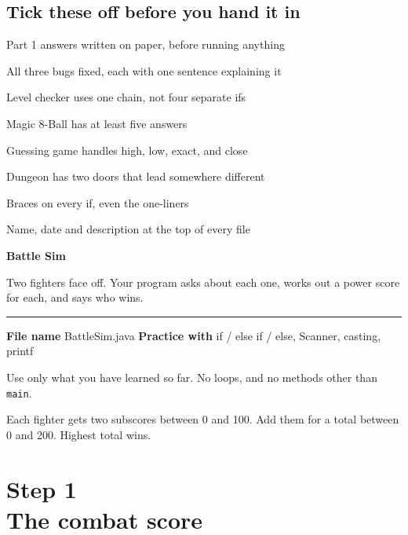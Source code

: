 \documentclass[11pt]{article}
\newcommand{\parttag}[1]{{\sffamily\footnotesize\color{arcane}#1}\\[1pt]}
\newcommand{\code}[1]{\texttt{#1}}
\begin{document}
\subsection*{Tick these off before you hand it in}

\begin{checks}
\item Part 1 answers written on paper, before running anything
\item All three bugs fixed, each with one sentence explaining it
\item Level checker uses one chain, not four separate ifs
\item Magic 8-Ball has at least five answers
\item Guessing game handles high, low, exact, and close
\item Dungeon has two doors that lead somewhere different
\item Braces on every if, even the one-liners
\item Name, date and description at the top of every file
\end{checks}

\clearpage


{\sffamily\bfseries\fontsize{30}{33}\selectfont\color{ink} Battle Sim\par}

\vspace{4pt}
{\color{soft}\large Two fighters face off. Your program asks about each one, works out a power score for each, and says who wins.\par}

\vspace{10pt}
{\color{hair}\rule{\linewidth}{1.2pt}}

\vspace{2pt}
{\sffamily\small\color{soft}\textbf{File name} BattleSim.java \quad\textbullet\quad
\textbf{Practice with} if / else if / else, Scanner, casting, printf}

\vspace{8pt}

Use only what you have learned so far. No loops, and no methods other than \code{main}.

Each fighter gets two subscores between 0 and 100. Add them for a total between 0 and 200. Highest total wins.

\section{\parttag{Step 1}The combat score}
\end{document}
